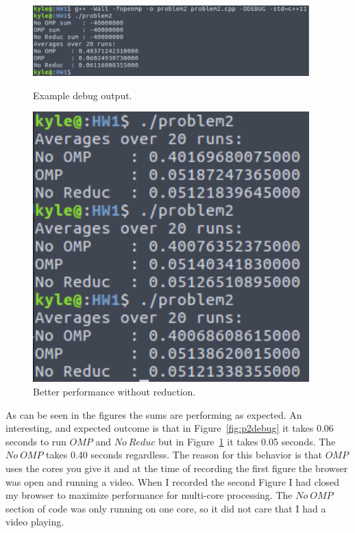 \documentclass{article}
\begin{document}
\begin{figure}[h]
    \centering
    \begin{minipage}{0.7\textwidth}
        \centering
        \includegraphics[width=0.95\textwidth]{Problem2debug}
        \caption[Example Debug Output]{Example debug output.}
        \label{fig:p2debug}
    \end{minipage}\hfill
    \begin{minipage}{0.3\textwidth}
        \centering
        \includegraphics[width=0.95\textwidth]{Problem2_60}
        \caption[Timed Reduction Methods]{Better performance without reduction.}
        \label{fig:p2}
    \end{minipage}
\end{figure}

As can be seen in the figures the sums are performing as expected. An interesting, and expected outcome is that in Figure~\ref{fig:p2debug} it takes 0.06 seconds to run $OMP$ and $No\ Reduc$ but in Figure~\ref{fig:p2} it takes 0.05 seconds. The $No\ OMP$ takes 0.40 seconds regardless. The reason for this behavior is that $OMP$ uses the cores you give it and at the time of recording the first figure the browser was open and running a video. When I recorded the second Figure I had closed my browser to maximize performance for multi-core processing. The $No\ OMP$ section of code was only running on one core, so it did not care that I had a video playing.
\end{document}
